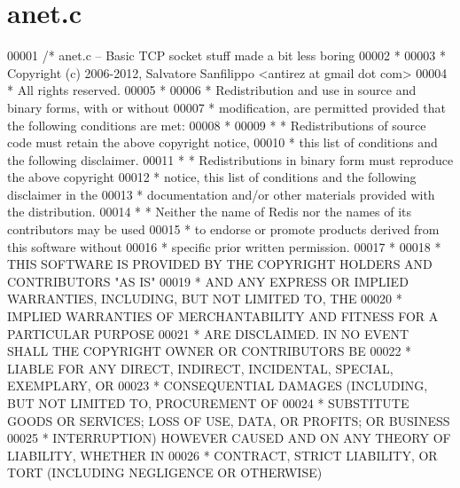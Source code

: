 \hypertarget{anet_8c_source}{}\section{anet.\+c}
\label{anet_8c_source}

\begin{DoxyCode}
00001 \textcolor{comment}{/* anet.c -- Basic TCP socket stuff made a bit less boring}
00002 \textcolor{comment}{ *}
00003 \textcolor{comment}{ * Copyright (c) 2006-2012, Salvatore Sanfilippo <antirez at gmail dot com>}
00004 \textcolor{comment}{ * All rights reserved.}
00005 \textcolor{comment}{ *}
00006 \textcolor{comment}{ * Redistribution and use in source and binary forms, with or without}
00007 \textcolor{comment}{ * modification, are permitted provided that the following conditions are met:}
00008 \textcolor{comment}{ *}
00009 \textcolor{comment}{ *   * Redistributions of source code must retain the above copyright notice,}
00010 \textcolor{comment}{ *     this list of conditions and the following disclaimer.}
00011 \textcolor{comment}{ *   * Redistributions in binary form must reproduce the above copyright}
00012 \textcolor{comment}{ *     notice, this list of conditions and the following disclaimer in the}
00013 \textcolor{comment}{ *     documentation and/or other materials provided with the distribution.}
00014 \textcolor{comment}{ *   * Neither the name of Redis nor the names of its contributors may be used}
00015 \textcolor{comment}{ *     to endorse or promote products derived from this software without}
00016 \textcolor{comment}{ *     specific prior written permission.}
00017 \textcolor{comment}{ *}
00018 \textcolor{comment}{ * THIS SOFTWARE IS PROVIDED BY THE COPYRIGHT HOLDERS AND CONTRIBUTORS "AS IS"}
00019 \textcolor{comment}{ * AND ANY EXPRESS OR IMPLIED WARRANTIES, INCLUDING, BUT NOT LIMITED TO, THE}
00020 \textcolor{comment}{ * IMPLIED WARRANTIES OF MERCHANTABILITY AND FITNESS FOR A PARTICULAR PURPOSE}
00021 \textcolor{comment}{ * ARE DISCLAIMED. IN NO EVENT SHALL THE COPYRIGHT OWNER OR CONTRIBUTORS BE}
00022 \textcolor{comment}{ * LIABLE FOR ANY DIRECT, INDIRECT, INCIDENTAL, SPECIAL, EXEMPLARY, OR}
00023 \textcolor{comment}{ * CONSEQUENTIAL DAMAGES (INCLUDING, BUT NOT LIMITED TO, PROCUREMENT OF}
00024 \textcolor{comment}{ * SUBSTITUTE GOODS OR SERVICES; LOSS OF USE, DATA, OR PROFITS; OR BUSINESS}
00025 \textcolor{comment}{ * INTERRUPTION) HOWEVER CAUSED AND ON ANY THEORY OF LIABILITY, WHETHER IN}
00026 \textcolor{comment}{ * CONTRACT, STRICT LIABILITY, OR TORT (INCLUDING NEGLIGENCE OR OTHERWISE)}

\end{DoxyCode}
